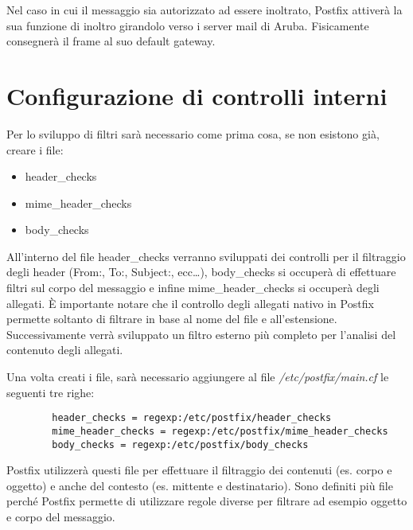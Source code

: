     Nel caso in cui il messaggio sia autorizzato ad essere inoltrato, Postfix attiverà la sua funzione di inoltro 
    girandolo verso i server mail di Aruba. Fisicamente consegnerà il frame al suo default gateway.

    \pagebreak
    \section{Configurazione di controlli interni}
    Per lo sviluppo di filtri sarà necessario come prima cosa, se non esistono già, creare i file:

    \begin{itemize}
        \item header\_checks
        \item mime\_header\_checks
        \item body\_checks
    \end{itemize}

    All'interno del file header\_checks verranno sviluppati dei controlli per il filtraggio degli header
    (From:, To:, Subject:, ecc\dots), body\_checks si occuperà di effettuare filtri sul corpo del messaggio e
    infine mime\_header\_checks si occuperà degli allegati. È importante notare che il controllo degli allegati
    nativo in Postfix permette soltanto di filtrare in base al nome del file e all'estensione. Successivamente 
    verrà sviluppato un filtro esterno più completo per l'analisi del contenuto degli allegati.

    Una volta creati i file, sarà necessario aggiungere al file \textit{/etc/postfix/main.cf} le seguenti tre righe:

    \begin{verbatim}
        header_checks = regexp:/etc/postfix/header_checks
        mime_header_checks = regexp:/etc/postfix/mime_header_checks
        body_checks = regexp:/etc/postfix/body_checks
    \end{verbatim}

    Postfix utilizzerà questi file per effettuare il filtraggio dei contenuti (es. corpo e oggetto) e anche del
    contesto (es. mittente e destinatario). Sono definiti più file perché Postfix permette di utilizzare regole 
    diverse per filtrare ad esempio oggetto e corpo del messaggio.

